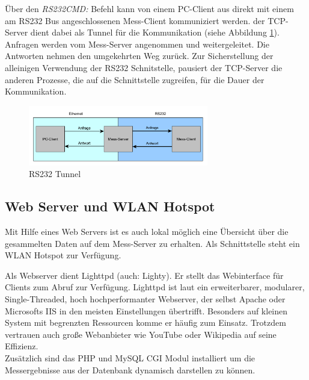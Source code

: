 Über den \textit{RS232CMD:} Befehl kann von einem PC-Client aus direkt mit einem am RS232 Bus angeschlossenen Mess-Client kommuniziert werden. der TCP-Server dient dabei als Tunnel für die Kommunikation (siehe Abbildung \ref{figure_RS232Tunnel}). Anfragen werden vom Mess-Server angenommen und weitergeleitet. Die Antworten nehmen den umgekehrten Weg zurück. Zur Sicherstellung der alleinigen Verwendung der RS232 Schnitstelle, pausiert der TCP-Server die anderen Prozesse, die auf die Schnittstelle zugreifen, für die Dauer der Kommunikation.\ 


\begin{figure}[H]
\begin{center}
\includegraphics[width=0.7\textwidth ]{img/general/RS232Tunnel.pdf}
\caption{RS232 Tunnel}
\label{figure_RS232Tunnel}
\end{center}
\end{figure}


\subsection{Web Server und WLAN Hotspot}
\label{section_WebServerWLANHotspot}

Mit Hilfe eines Web Servers ist es auch lokal möglich eine Übersicht über die gesammelten Daten auf dem Mess-Server zu erhalten. Als Schnittstelle steht ein WLAN Hotspot zur Verfügung.\ 

Als Webserver dient Lighttpd (auch: Lighty). Er stellt das Webinterface für Clients zum Abruf zur Verfügung. Lighttpd ist laut \cite{bogus2008lighttpd} ein erweiterbarer, modularer, Single-Threaded, hoch hochperformanter Webserver, der selbst Apache oder Microsofts IIS in den meisten Einstellungen übertrifft. Besonders auf kleinen System mit begrenzten Ressourcen komme er häufig zum Einsatz. Trotzdem vertrauen auch große Webanbieter wie YouTube oder Wikipedia auf seine Effizienz.\\
Zusätzlich sind das PHP und MySQL \ac{CGI} Modul installiert um die Messergebnisse aus der Datenbank dynamisch darstellen zu können. 

